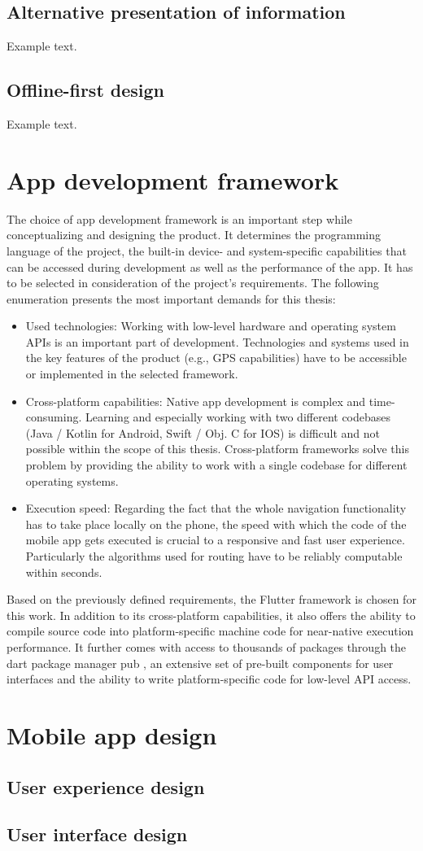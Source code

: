 \subsection{Alternative presentation of information}
Example text.
\subsection{Offline-first design}
Example text.

\section{App development framework}
The choice of app development framework is an important step while conceptualizing and designing the product. It determines the programming language of the project, the built-in device- and system-specific capabilities that can be accessed during development as well as the performance of the app. It has to be selected in consideration of the project's requirements. The following enumeration presents the most important demands for this thesis:
\begin{itemize}
    \item Used technologies: Working with low-level hardware and operating system APIs is an important part of development. Technologies and systems used in the key features of the product (e.g., GPS capabilities) have to be accessible or implemented in the selected framework.
    \item Cross-platform capabilities: Native app development is complex and time-consuming. Learning and especially working with two different codebases (Java / Kotlin for Android, Swift / Obj. C for IOS) is difficult and not possible within the scope of this thesis. Cross-platform frameworks solve this problem by providing the ability to work with a single codebase for different operating systems.
    \item Execution speed: Regarding the fact that the whole navigation functionality has to take place locally on the phone, the speed with which the code of the mobile app gets executed is crucial to a responsive and fast user experience. Particularly the algorithms used for routing have to be reliably computable within seconds.
\end{itemize}

Based on the previously defined requirements, the Flutter framework \cite{flutter} is chosen for this work. In addition to its cross-platform capabilities, it also offers the ability to compile source code into platform-specific machine code for near-native execution performance. It further comes with access to thousands of packages through the dart package manager pub \cite{pub_dev}, an extensive set of pre-built components for user interfaces and the ability to write platform-specific code for low-level API access.

\section{Mobile app design}
\subsection{User experience design}
\subsection{User interface design}